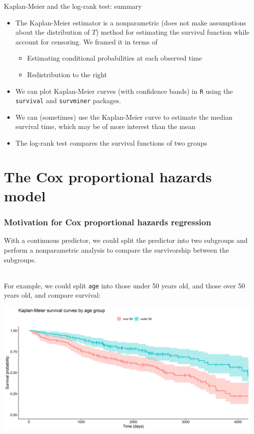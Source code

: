 \documentclass[10pt,t]{beamer}
\begin{document}
\begin{frame}{Kaplan-Meier and the log-rank test: summary}
	\begin{itemize}
		\item The Kaplan-Meier estimator is a nonparametric (does not make assumptions about the distribution of $T$) method for estimating the survival function while account for censoring. We framed it in terms of
		\begin{itemize}
			\item Estimating conditional probabilities at each observed time
			\item Redistribution to the right
		\end{itemize}
		\item We can plot Kaplan-Meier curves (with confidence bands) in \texttt{R} using the \texttt{survival} and \texttt{survminer} packages. 
		\item We can (sometimes) use the Kaplan-Meier curve to estimate the median survival time, which may be of more interest than the mean
		\item The log-rank test compares the survival functions of two groups
	\end{itemize}
\end{frame}

\section{The Cox proportional hazards model}
\begin{frame}
\frametitle{Motivation for Cox proportional hazards regression}
\vspace{-0.8cm}
With a continuous predictor, we could split the predictor into two subgroups and perform a nonparametric analysis to compare the survivorship between the subgroups.
\\ ~\ 

For example, we could split \texttt{age} into those under 50 years old, and those over 50 years old, and compare survival:

\begin{center}
\includegraphics[width = \textwidth]{figs/KM_strat_age.png}
\end{center}
\end{frame}
\end{document}
